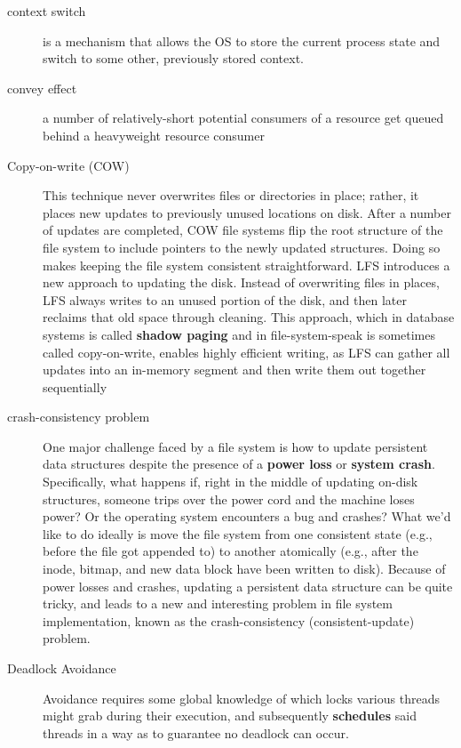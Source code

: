 \begin{description}
\item[context switch] is a mechanism that allows the OS to store the current process state and switch to some other, previously stored context.

\item[convey effect] a number of relatively-short potential consumers of a resource get queued behind a heavyweight resource consumer

\item[Copy-on-write (COW)] This technique never overwrites files or directories in place; rather, it places new updates to previously unused locations on disk. After a number of updates are completed, COW file systems flip the root structure of the file system to include pointers to the newly updated structures. Doing so makes keeping the file system consistent straightforward.  LFS introduces a new approach to updating the disk. Instead of overwriting files in places, LFS always writes to an unused portion of the disk, and then later reclaims that old space through cleaning. This approach, which in database systems is called \textbf{shadow paging} and in file-system-speak is sometimes called copy-on-write, enables highly efficient writing, as LFS can gather all updates into an in-memory segment and then write them out together sequentially

\item[crash-consistency problem] One major challenge faced by a file system is how to update persistent data structures despite the presence of a \textbf{power loss} or \textbf{system crash}. Specifically, what happens if, right in the middle of updating on-disk structures, someone trips over the power cord and the machine loses power? Or the operating system encounters a bug and crashes? What we’d like to do ideally is move the file system from one consistent state (e.g., before the file got appended to) to another atomically (e.g., after the inode, bitmap, and new data block have been written to disk). Because of power losses and crashes, updating a persistent data structure can be quite tricky, and leads to a new and interesting problem in file system implementation, known as the crash-consistency (consistent-update) problem.

\item[Deadlock Avoidance] Avoidance requires some global knowledge of which locks various threads might grab during their execution, and subsequently \textbf{schedules} said threads in a way as to guarantee no deadlock can occur.


\end{description}
